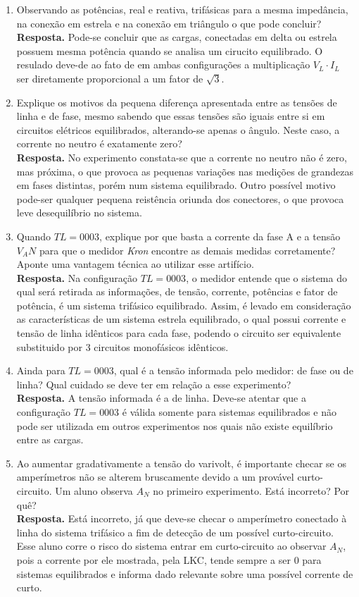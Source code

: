 \documentclass[a4paper,12pt,oneside,openany,table,xcdraw]{article}
\begin{document}
\begin{enumerate}[1)]
 \item Observando as potências, real e reativa, trifásicas para a mesma impedância, na
conexão em estrela e na conexão em triângulo o que pode concluir?\\
\textbf{Resposta.} Pode-se concluir que as cargas, conectadas em delta ou estrela possuem mesma potência quando se analisa um cirucito equilibrado. O resulado deve-de ao fato de em ambas configurações a multiplicação $V_L\cdot I_L$ ser diretamente proporcional a um fator de $\sqrt{3}$.

 \item Explique os motivos da pequena diferença apresentada entre as tensões de linha e
de fase, mesmo sabendo que essas tensões são iguais entre si em circuitos elétricos
equilibrados, alterando-se apenas o ângulo. Neste caso, a corrente no neutro é
exatamente zero?\\
\textbf{Resposta.} No experimento constata-se que a corrente no neutro não é zero, mas próxima, o que provoca as pequenas variações nas medições de grandezas em fases distintas, porém num sistema equilibrado. Outro possível motivo pode-ser qualquer pequena reistência oriunda dos conectores, o que provoca leve desequilíbrio no sistema. 

 \item Quando $TL = 0003$, explique por que basta a corrente da fase A e a tensão $V_AN$
para que o medidor \emph{Kron} encontre as demais medidas corretamente? Aponte uma
vantagem técnica ao utilizar esse artifício.\\
\textbf{Resposta.} Na configuração $TL = 0003$, o medidor entende que o sistema do qual será retirada as informações, de tensão, corrente, potências e fator de potência, é um sistema trifásico equilibrado. Assim, é levado em consideração as características de um sistema estrela equilibrado, o qual possui corrente e tensão de linha idênticos para cada fase, podendo o circuito ser equivalente substituido por 3 circuitos monofásicos idênticos.

 \item Ainda para $TL = 0003$, qual é a tensão informada pelo medidor: de fase ou de
linha? Qual cuidado se deve ter em relação a esse experimento?\\
\textbf{Resposta.} A tensão informada é a de linha. Deve-se atentar que a configuração $TL = 0003$ é válida somente para sistemas equilibrados e não pode ser utilizada em outros experimentos nos quais não existe equilíbrio entre as cargas.

 \item Ao aumentar gradativamente a tensão do varivolt, é importante checar se os
amperímetros não se alterem bruscamente devido a um provável curto-circuito. Um
aluno observa $A_N$ no primeiro experimento. Está incorreto? Por quê?\\
\textbf{Resposta.} Está incorreto, já que deve-se checar o amperímetro conectado à linha do sistema trifásico a fim de detecção de um possível curto-circuito. Esse aluno corre o risco do sistema entrar em curto-circuito ao observar $A_N$, pois a corrente por ele mostrada, pela LKC, tende sempre a ser 0 para sistemas equilibrados e informa dado relevante sobre uma possível corrente de curto.


\end{enumerate}
\end{document}
